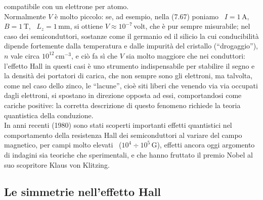 compatibile con un elettrone per atomo.\\
Normalmente $V$ \`e molto piccolo: se, ad esempio, nella (7.67) poniamo
\ $I=1$\,A, \ $B=1$\,T, \ $L_z=1$\,mm, si ottiene $V\approx10^{-7}$\,volt, che
\`e pur sempre misurabile; nel caso dei semiconduttori, sostanze come il
germanio ed il silicio la cui conducibilit\`a dipende fortemente dalla
temperatura e dalle impurit\`a del cristallo (``drogaggio''), $n$ vale circa
$10^{12}\,\mathrm{cm}^{-3}$, e ci\`o fa s\`i che $V$ sia molto maggiore che nei
conduttori: l'effetto Hall in questi casi \`e uno strumento indispensabile per
stabilire il segno e la densit\`a dei portatori di carica, che non sempre sono
gli elettroni, ma talvolta, come nel caso dello zinco, le ``lacune'', cio\`e
siti liberi che venendo via via occupati dagli elettroni, si spostano in
direzione opposta ad essi, comportandosi come cariche positive: la corretta
descrizione di questo fenomeno richiede la teoria quantistica della
conduzione.\\
In anni recenti (1980) sono stati scoperti importanti effetti quantistici nel
comportamento della resistenza Hall dei semiconduttori al variare del campo
magnetico, per campi molto elevati \ ($10^4\div10^5$\,G), effetti ancora oggi
argomento di indagini sia teoriche che sperimentali, e che hanno fruttato il
premio Nobel al suo scopritore Klaus von Klitzing.

\subsection{Le simmetrie nell'effetto Hall}

